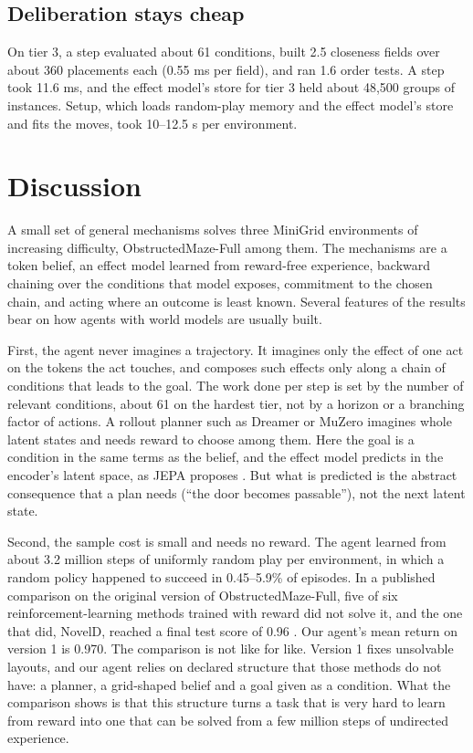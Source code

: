 \documentclass{article}
\begin{document}
\subsection{Deliberation stays cheap}

On tier 3, a step evaluated about 61 conditions, built 2.5 closeness fields over about 360 placements each (0.55 ms per field), and ran 1.6 order tests. A step took 11.6 ms, and the effect model's store for tier 3 held about 48,500 groups of instances. Setup, which loads random-play memory and the effect model's store and fits the moves, took 10--12.5 s per environment.

\section{Discussion}

A small set of general mechanisms solves three MiniGrid environments of increasing difficulty, ObstructedMaze-Full among them. The mechanisms are a token belief, an effect model learned from reward-free experience, backward chaining over the conditions that model exposes, commitment to the chosen chain, and acting where an outcome is least known. Several features of the results bear on how agents with world models are usually built.

First, the agent never imagines a trajectory. It imagines only the effect of one act on the tokens the act touches, and composes such effects only along a chain of conditions that leads to the goal. The work done per step is set by the number of relevant conditions, about 61 on the hardest tier, not by a horizon or a branching factor of actions. A rollout planner such as Dreamer or MuZero \cite{Hafner2025,Schrittwieser2020} imagines whole latent states and needs reward to choose among them. Here the goal is a condition in the same terms as the belief, and the effect model predicts in the encoder's latent space, as JEPA proposes \cite{LeCun2022}. But what is predicted is the abstract consequence that a plan needs (``the door becomes passable''), not the next latent state.

Second, the sample cost is small and needs no reward. The agent learned from about 3.2 million steps of uniformly random play per environment, in which a random policy happened to succeed in 0.45--5.9\% of episodes. In a published comparison on the original version of ObstructedMaze-Full, five of six reinforcement-learning methods trained with reward did not solve it, and the one that did, NovelD, reached a final test score of 0.96 \cite{Zhang2021}. Our agent's mean return on version 1 is 0.970. The comparison is not like for like. Version 1 fixes unsolvable layouts, and our agent relies on declared structure that those methods do not have: a planner, a grid-shaped belief and a goal given as a condition. What the comparison shows is that this structure turns a task that is very hard to learn from reward into one that can be solved from a few million steps of undirected experience.
\end{document}
